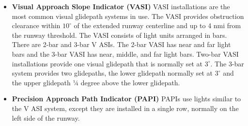 \documentclass[12pt]{article}
\begin{document}
			\begin{itemize}
				\item \textbf{Visual Approach Slope Indicator (VASI)} VASI installations are the most common visual glidepath systems in use. The VASI provides obstruction clearance within $10^\circ$ of the extended runway centerline and up to 4 nmi from the runway threshold. The VASI consists of light units arranged in bars. There are 2-bar and 3-bar V ASIs. The 2-bar VASI has near and far light bars and the 3-bar VASI has near, middle, and far light bars. Two-bar VASI installations provide one visual glidepath that is normally set at $3^\circ$. The 3-bar system provides 	two glidepaths, the lower glidepath normally set at $3^\circ$ and the upper glidepath 1⁄4 degree above the lower glidepath.
				\item \textbf{Precision Approach Path Indicator (PAPI)} PAPIs  use lights similar to the V ASI system, except they are installed in a single row, normally on the left side of the runway.
			\end{itemize}
				\begin{figure}[H]
				    \centering
				\end{figure}
\end{document}
